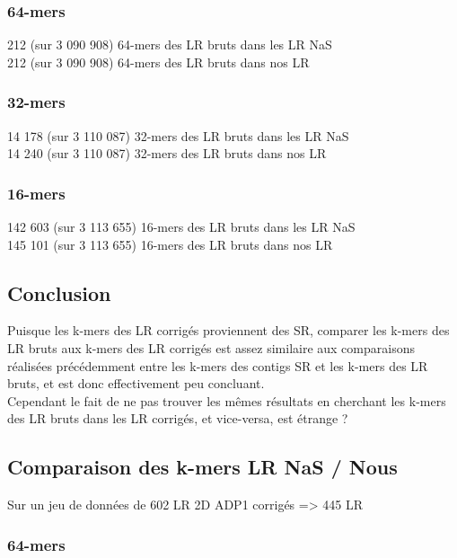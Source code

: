 \documentclass[12pt]{article}
\begin{document}
\subsubsection{64-mers}

212 (sur 3 090 908) 64-mers des LR bruts dans les LR NaS \\

212 (sur 3 090 908) 64-mers des LR bruts dans nos LR

\subsubsection{32-mers}

14 178 (sur 3 110 087) 32-mers des LR bruts dans les LR NaS \\

14 240 (sur 3 110 087) 32-mers des LR bruts dans nos LR

\subsubsection{16-mers}

142 603 (sur 3 113 655) 16-mers des LR bruts dans les LR NaS \\

145 101 (sur 3 113 655) 16-mers des LR bruts dans nos LR

\subsection{Conclusion}

Puisque les k-mers des LR corrigés proviennent des SR, comparer les k-mers des LR bruts aux k-mers des LR corrigés
est assez similaire aux comparaisons réalisées précédemment entre les k-mers des contigs SR et les k-mers des LR bruts,
et est donc effectivement peu concluant. \\

Cependant le fait de ne pas trouver les mêmes résultats en cherchant les k-mers des LR bruts dans les LR corrigés, et vice-versa, est étrange ?

\subsection{Comparaison des k-mers LR NaS / Nous}

Sur un jeu de données de 602 LR 2D ADP1 corrigés => 445 LR

\subsubsection{64-mers}
\end{document}
